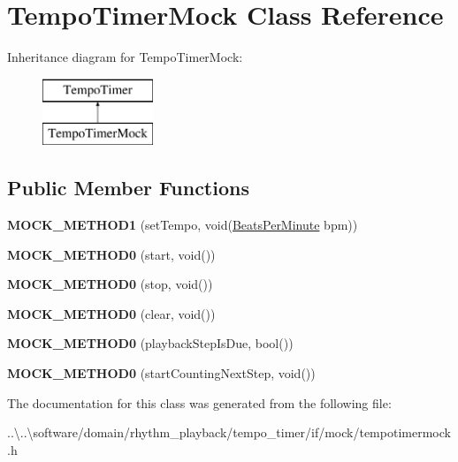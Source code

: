 \hypertarget{class_tempo_timer_mock}{}\section{Tempo\+Timer\+Mock Class Reference}
\label{class_tempo_timer_mock}
Inheritance diagram for Tempo\+Timer\+Mock\+:\begin{figure}[H]
\begin{center}
\leavevmode
\includegraphics[height=2.000000cm]{class_tempo_timer_mock}
\end{center}
\end{figure}
\subsection*{Public Member Functions}
\begin{DoxyCompactItemize}
\item 
\mbox{\label{class_tempo_timer_mock_a744b62ff6f202c876325f757f9ccc836}} 
{\bfseries M\+O\+C\+K\+\_\+\+M\+E\+T\+H\+O\+D1} (set\+Tempo, void(\mbox{\hyperlink{class_beats_per_minute}{Beats\+Per\+Minute}} bpm))
\item 
\mbox{\label{class_tempo_timer_mock_a77a9c50cf356c36511139c8270625793}} 
{\bfseries M\+O\+C\+K\+\_\+\+M\+E\+T\+H\+O\+D0} (start, void())
\item 
\mbox{\label{class_tempo_timer_mock_a79ac2d1e81fe29d3301b8c38c93879d1}} 
{\bfseries M\+O\+C\+K\+\_\+\+M\+E\+T\+H\+O\+D0} (stop, void())
\item 
\mbox{\label{class_tempo_timer_mock_a2a9634cefd6bafe16cd7f09621a57fe9}} 
{\bfseries M\+O\+C\+K\+\_\+\+M\+E\+T\+H\+O\+D0} (clear, void())
\item 
\mbox{\label{class_tempo_timer_mock_ac38619037ba0cdc4659286cb512ff08a}} 
{\bfseries M\+O\+C\+K\+\_\+\+M\+E\+T\+H\+O\+D0} (playback\+Step\+Is\+Due, bool())
\item 
\mbox{\label{class_tempo_timer_mock_a2db4e5a24a1e9e2c253d9efcc8a3f6c5}} 
{\bfseries M\+O\+C\+K\+\_\+\+M\+E\+T\+H\+O\+D0} (start\+Counting\+Next\+Step, void())
\end{DoxyCompactItemize}


The documentation for this class was generated from the following file\+:\begin{DoxyCompactItemize}
\item 
..\textbackslash{}..\textbackslash{}software/domain/rhythm\+\_\+playback/tempo\+\_\+timer/if/mock/tempotimermock.\+h\end{DoxyCompactItemize}
